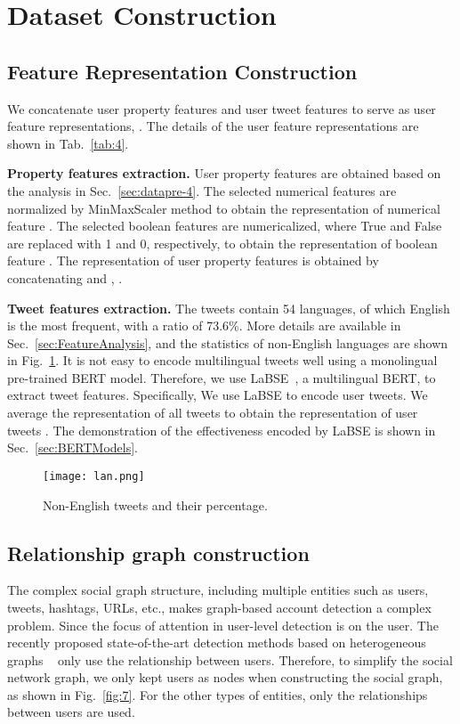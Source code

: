 \documentclass[10pt,twocolumn,letterpaper]{article}
\begin{document}
\section{Dataset Construction}
\subsection{Feature Representation Construction}
\noindent
We concatenate user property features and user tweet features to serve as user feature representations, . The details of the user feature representations are shown in Tab.~\ref{tab:4}.

\noindent
\textbf{Property features extraction.}
User property features are obtained based on the analysis in Sec.~\ref{sec:datapre-4}. The selected numerical features are normalized by MinMaxScaler method to obtain the representation of numerical feature . The selected boolean features are numericalized, where True and False are replaced with 1 and 0, respectively, to obtain the representation of boolean feature . The representation of user property features is obtained by concatenating  and , .

\noindent
\textbf{Tweet features extraction.}
The tweets contain 54 languages, of which English is the most frequent, with a ratio of 73.6\%. More details are available in Sec.~\ref{sec:FeatureAnalysis}, and the statistics of non-English languages are shown in Fig.~\ref{fig:5}. It is not easy to encode multilingual tweets well using a monolingual pre-trained BERT model. Therefore, we use LaBSE~\cite{Alpher54}, a multilingual BERT, to extract tweet features. Specifically, We use LaBSE to encode user tweets. We average the representation of all tweets to obtain the representation of user tweets .
The demonstration of the effectiveness encoded by LaBSE is shown in Sec.~\ref{sec:BERTModels}.

\begin{figure}[h]
  \centering
   \texttt{[image: lan.png]}
     \vspace{-0.2cm}
   \caption{Non-English tweets and their percentage.}
     \vspace{-0.2cm}
   \label{fig:5}
\end{figure}



\subsection{Relationship graph construction}
The complex social graph structure, including multiple entities such as users, tweets, hashtags, URLs, etc., makes graph-based account detection a complex problem. Since the focus of attention in user-level detection is on the user. The recently proposed state-of-the-art detection methods based on heterogeneous graphs ~\cite{Alpher06,Alpher44,Alpher45,Alpher46} only use the relationship between users. Therefore, to simplify the social network graph, we only kept users as nodes when constructing the social graph, as shown in Fig.~\ref{fig:7}. For the other types of entities, only the relationships between users are used.
\end{document}
